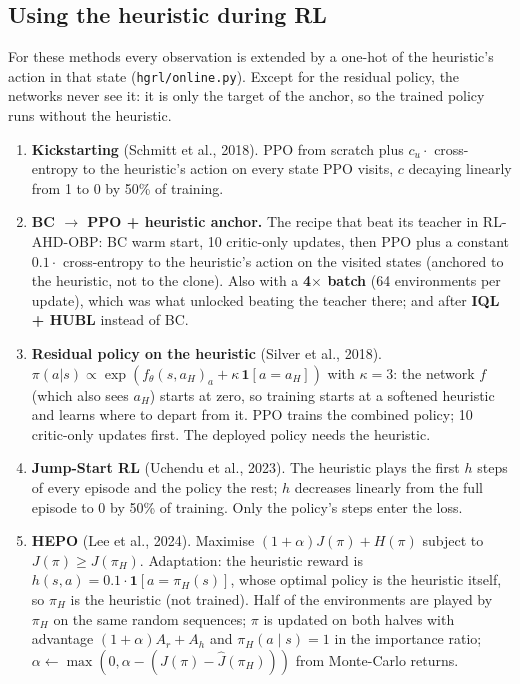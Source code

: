 \documentclass[11pt,a4paper]{article}
\begin{document}
\subsection{Using the heuristic during RL}
For these methods every observation is extended by a one-hot of the heuristic's action in that state
(\texttt{hgrl/online.py}). Except for the residual policy, the networks never see it: it is only the target of the
anchor, so the trained policy runs without the heuristic.
\begin{enumerate}[leftmargin=*,resume]
\item \textbf{Kickstarting} (Schmitt et al., 2018). PPO from scratch plus $c_u \cdot$ cross-entropy to the heuristic's
  action on every state PPO visits, $c$ decaying linearly from 1 to 0 by 50\% of training.
\item \textbf{BC $\to$ PPO + heuristic anchor.} The recipe that beat its teacher in RL-AHD-OBP: BC warm start,
  10 critic-only updates, then PPO plus a constant $0.1 \cdot$ cross-entropy to the heuristic's action on the visited
  states (anchored to the heuristic, not to the clone). Also with a \textbf{4$\times$ batch} (64 environments per
  update), which was what unlocked beating the teacher there; and after \textbf{IQL + HUBL} instead of BC.
\item \textbf{Residual policy on the heuristic} (Silver et al., 2018). $\pi(a|s) \propto
  \exp(f_\theta(s, a_H)_a + \kappa\, \mathbf 1[a = a_H])$ with $\kappa = 3$: the network $f$ (which also sees $a_H$)
  starts at zero, so training starts at a softened heuristic and learns where to depart from it. PPO trains the
  combined policy; 10 critic-only updates first. The deployed policy needs the heuristic.
\item \textbf{Jump-Start RL} (Uchendu et al., 2023). The heuristic plays the first $h$ steps of every episode and the
  policy the rest; $h$ decreases linearly from the full episode to 0 by 50\% of training. Only the policy's steps
  enter the loss.
\item \textbf{HEPO} (Lee et al., 2024). Maximise $(1+\alpha)J(\pi) + H(\pi)$ subject to $J(\pi) \ge J(\pi_H)$.
  Adaptation: the heuristic reward is $h(s,a) = 0.1\cdot\mathbf 1[a = \pi_H(s)]$, whose optimal policy is the
  heuristic itself, so $\pi_H$ is the heuristic (not trained). Half of the environments are played by $\pi_H$ on the
  same random sequences; $\pi$ is updated on both halves with advantage $(1+\alpha)A_r + A_h$ and
  $\pi_H(a\mid s) = 1$ in the importance ratio; $\alpha \leftarrow \max(0, \alpha - (\hat J(\pi) - \hat J(\pi_H)))$
  from Monte-Carlo returns.
\end{enumerate}
\end{document}
